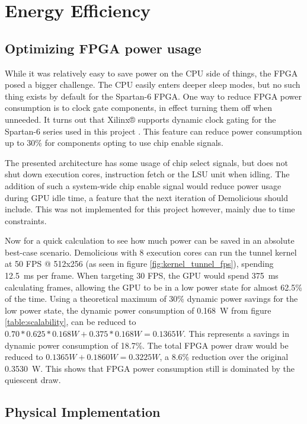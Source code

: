 \documentclass[../main/report.tex]{subfiles}
\begin{document}
\section{Energy Efficiency}

\subsection{Optimizing FPGA power usage}

While it was relatively easy to save power on the CPU side of things, the FPGA posed a bigger challenge.
The CPU easily enters deeper sleep modes, but no such thing exists by default for the Spartan-6 FPGA.
One way to reduce FPGA power consumption is to clock gate components, in effect turning them off when unneeded.
It turns out that Xilinx® supports dynamic clock gating for the Spartan-6 series used in this project \cite{xilinx-clock-gating}.
This feature can reduce power consumption up to 30\% for components opting to use chip enable signals.

The presented architecture has some usage of chip select signals, but does not shut down execution cores, instruction fetch or the LSU unit when idling.
The addition of such a system-wide chip enable signal would reduce power usage during GPU idle time, a feature that the next iteration of Demolicious should include.
This was not implemented for this project however, mainly due to time constraints.

Now for a quick calculation to see how much power can be saved in an absolute best-case scenario.
Demolicious with 8 execution cores can run the tunnel kernel at 50 FPS @ 512x256 (as seen in figure \ref{fig:kernel_tunnel_fps}), spending \SI{12.5}{ms} per frame.
When targeting 30 FPS, the GPU would spend \SI{375}{ms} calculating frames, allowing the GPU to be in a low power state for almost 62.5\% of the time.
Using a theoretical maximum of 30\% dynamic power savings for the low power state, the dynamic power consumption of \SI{0.168}{W} from figure \ref{table:scalability}, can be reduced to $ 0.70 * 0.625 * 0.168 W + 0.375 * 0.168 W = 0.1365 W$.
This represents a savings in dynamic power consumption of 18.7\%.
The total FPGA power draw would be reduced to $ 0.1365 W + 0.1860 W = 0.3225 W$, a 8.6\% reduction over the original \SI{0.3530}{W}.
This shows that FPGA power consumption still is dominated by the quiescent draw.

\subsection{Physical Implementation}
\end{document}
